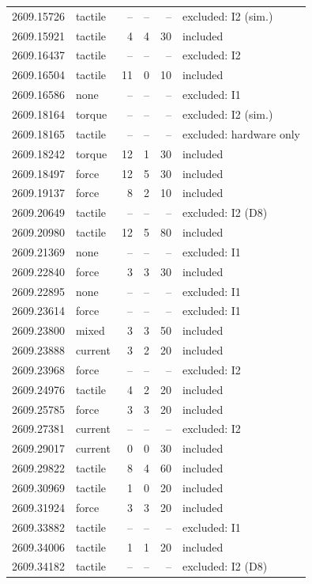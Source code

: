 \begin{longtable}{@{}llrrrl@{}}
2609.15726 & tactile & -- & -- & -- & excluded: I2 (sim.) \\
2609.15921 & tactile & 4 & 4 & 30 & included \\
2609.16437 & tactile & -- & -- & -- & excluded: I2 \\
2609.16504 & tactile & 11 & 0 & 10 & included \\
2609.16586 & none & -- & -- & -- & excluded: I1 \\
2609.18164 & torque & -- & -- & -- & excluded: I2 (sim.) \\
2609.18165 & tactile & -- & -- & -- & excluded: hardware only \\
2609.18242 & torque & 12 & 1 & 30 & included \\
2609.18497 & force & 12 & 5 & 30 & included \\
2609.19137 & force & 8 & 2 & 10 & included \\
2609.20649 & tactile & -- & -- & -- & excluded: I2 (D8) \\
2609.20980 & tactile & 12 & 5 & 80 & included \\
2609.21369 & none & -- & -- & -- & excluded: I1 \\
2609.22840 & force & 3 & 3 & 30 & included \\
2609.22895 & none & -- & -- & -- & excluded: I1 \\
2609.23614 & force & -- & -- & -- & excluded: I1 \\
2609.23800 & mixed & 3 & 3 & 50 & included \\
2609.23888 & current & 3 & 2 & 20 & included \\
2609.23968 & force & -- & -- & -- & excluded: I2 \\
2609.24976 & tactile & 4 & 2 & 20 & included \\
2609.25785 & force & 3 & 3 & 20 & included \\
2609.27381 & current & -- & -- & -- & excluded: I2 \\
2609.29017 & current & 0 & 0 & 30 & included \\
2609.29822 & tactile & 8 & 4 & 60 & included \\
2609.30969 & tactile & 1 & 0 & 20 & included \\
2609.31924 & force & 3 & 3 & 20 & included \\
2609.33882 & tactile & -- & -- & -- & excluded: I1 \\
2609.34006 & tactile & 1 & 1 & 20 & included \\
2609.34182 & tactile & -- & -- & -- & excluded: I2 (D8) \\

\end{longtable}
